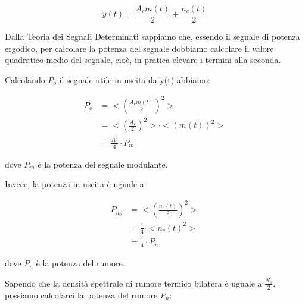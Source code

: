 {
    \Large 
    \begin{equation}
    y(t)
    = 
    \frac{A_c m(t)}{2}
    + 
    \frac{n_c (t)}{2}  
    \end{equation}
}

Dalla Teoria dei Segnali Determinati sappiamo che, essendo il segnale di potenza ergodico, 
per calcolare la potenza del segnale dobbiamo calcolare il valore quadratico medio del segnale, cioè, in pratica elevare i termini alla seconda. \newline 

Calcolando $P_o$ il segnale utile in uscita da y(t) abbiamo: 


{
    \Large
    \begin{equation}
        \begin{split}
            P_o 
       &=
    <  
       \left(
        \frac{A_c m(t)}{2}
       \right)^{2} 
    >  
    \\
    &= 
    < \left(\frac{A_c}{2} \right)^{2} >  \cdot <(m(t))^{2} >
    \\
    &= 
    \frac{A_c ^{2}}{4} \cdot P_m
        \end{split}   
    \end{equation}
}

dove $P_m$ è la potenza del segnale modulante. \newline 

Invece, la potenza in uscita è uguale a: 

{
    \Large 
    \begin{equation}
        \begin{split}
        P_{n_{o}}  
        &=
         <  
       \left(
        \frac{n_c (t)}{2}
       \right)^{2} 
    >  
    \\
    &= 
    \frac{1}{4} \cdot < n_c(t) ^{2} > 
    \\
    &=    
    \frac{1}{4} \cdot P_n
        \end{split}
    \end{equation}
}

dove $P_n$ è la potenza del rumore. \newline 

Sapendo che la densità spettrale di rumore termico bilatera è uguale a $\frac{N_0}{2}$, 
possiamo calcolarci la potenza del rumore $P_n$: 

